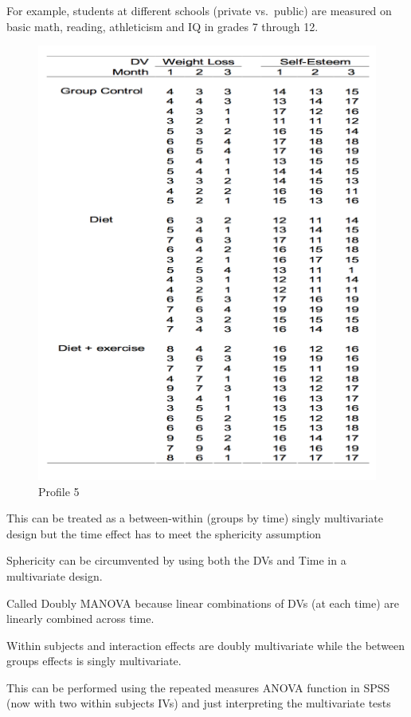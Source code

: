 \documentclass[]{book}
\theoremstyle{definition}
\theoremstyle{definition}
\theoremstyle{definition}
\theoremstyle{remark}
\begin{document}
{For example, students at different schools (private vs.~public) are
measured on basic math, reading, athleticism and IQ in grades 7 through
12.

\begin{figure}
\centering
\includegraphics{img/jhprofile5.png}
\caption{Profile 5}
\end{figure}

This can be treated as a between-within (groups by time) singly
multivariate design but the time effect has to meet the sphericity
assumption

Sphericity can be circumvented by using both the DVs and Time in a
multivariate design.

Called Doubly MANOVA because linear combinations of DVs (at each time)
are linearly combined across time.

Within subjects and interaction effects are doubly multivariate while
the between groups effects is singly multivariate.

This can be performed using the repeated measures ANOVA function in SPSS
(now with two within subjects IVs) and just interpreting the
multivariate tests

}
\end{document}
